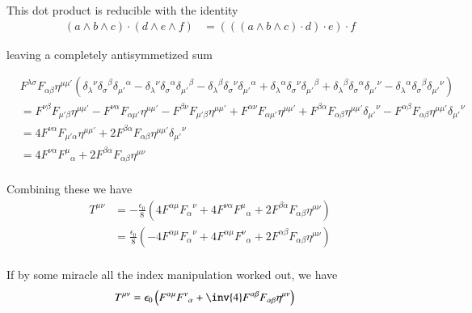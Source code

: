 This dot product is reducible with the identity
\begin{align*}
(a \wedge b \wedge c) \cdot (d \wedge e \wedge f) &= 
(((a \wedge b \wedge c) \cdot d) \cdot e) \cdot f 
\end{align*}

leaving a completely antisymmetized sum

\begin{align*}
&
F^{\lambda\sigma} F_{\alpha\beta} 
\eta^{\mu\mu'} 
(
{\delta_\lambda}^\nu {\delta_\sigma}^\beta {\delta_{\mu'}}^\alpha
-{\delta_\lambda}^\nu {\delta_\sigma}^\alpha {\delta_{\mu'}}^\beta
-{\delta_\lambda}^\beta {\delta_\sigma}^\nu {\delta_{\mu'}}^\alpha
+{\delta_\lambda}^\alpha {\delta_\sigma}^\nu {\delta_{\mu'}}^\beta
+{\delta_\lambda}^\beta {\delta_\sigma}^\alpha {\delta_{\mu'}}^\nu
-{\delta_\lambda}^\alpha {\delta_\sigma}^\beta {\delta_{\mu'}}^\nu
) \\
&=
  F^{\nu\beta} F_{{\mu'}\beta} \eta^{\mu\mu'} 
- F^{\nu\alpha} F_{\alpha{\mu'}} \eta^{\mu\mu'}
- F^{\beta\nu} F_{{\mu'}\beta} \eta^{\mu\mu'} 
+ F^{\alpha\nu} F_{\alpha{\mu'}} \eta^{\mu\mu'} 
+ F^{\beta\alpha} F_{\alpha\beta} \eta^{\mu\mu'} {\delta_{\mu'}}^\nu
- F^{\alpha\beta} F_{\alpha\beta} \eta^{\mu\mu'} {\delta_{\mu'}}^\nu
 \\
&=
4 F^{\nu\alpha} F_{{\mu'}\alpha} \eta^{\mu\mu'} 
+ 2 F^{\beta\alpha} F_{\alpha\beta} \eta^{\mu\mu'} {\delta_{\mu'}}^\nu
 \\
&=
4 F^{\nu\alpha} {F^{\mu}}_{\alpha} 
+ 2 F^{\beta\alpha} F_{\alpha\beta} \eta^{\mu\nu} 
 \\
\end{align*}

Combining these we have
\begin{align*}
T^{\mu\nu}
&= 
-\frac{\epsilon_0}{8} \left(
 4 F^{\alpha\mu} {F_{\alpha}}^{\nu} 
+ 4 F^{\nu\alpha} {F^{\mu}}_{\alpha} 
+ 2 F^{\beta\alpha} F_{\alpha\beta} \eta^{\mu\nu} 
\right) \\
&= 
\frac{\epsilon_0}{8} \left(
- 4 F^{\alpha\mu} {F_{\alpha}}^{\nu} 
+ 4 F^{\alpha\mu} {F^{\nu}}_{\alpha}
+ 2 F^{\alpha\beta} F_{\alpha\beta} \eta^{\mu\nu} 
\right) \\
\end{align*}


If by some miracle all the index manipulation worked out, we have
\begin{align}\label{eqn:stressEnTen:miracle}
T^{\mu\nu} &= {\epsilon_0} \left( F^{\alpha\mu} {F^{\nu}}_{\alpha} + \inv{4} F^{\alpha\beta} F_{\alpha\beta} \eta^{\mu\nu} \right)
\end{align}

